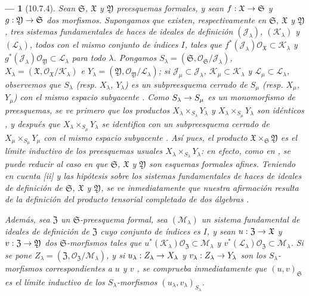 \documentclass[oneside]{amsart}
\theoremstyle{ega-env-style}
\newtheorem*{env}{---}
\theoremstyle{ega-thm-env-style}
\theoremstyle{ega-defn-env-style}
\renewcommand{\to}{\mathchoice{\longrightarrow}{\rightarrow}{\rightarrow}{\rightarrow}}
\newcommand{\oldpage}[2][]{{\marginnote{\normalfont{\textbf{#1}~|~#2}}}\ignorespaces}
\let\EGAOriginalLabel\label
\renewcommand{\label}[1]{\phantomsection\EGAOriginalLabel{#1}}
\begin{document}
\begin{env}[10.7.4]
\label{I.10.7.4}
Sean $\mathfrak{S}$, $\mathfrak{X}$ y $\mathfrak{Y}$ preesquemas formales, y sean $f:\mathfrak{X}\to\mathfrak{S}$ y $g:\mathfrak{Y}\to\mathfrak{S}$ dos morfismos.
Supongamos que existen, respectivamente en $\mathfrak{S}$, $\mathfrak{X}$ y $\mathfrak{Y}$, tres sistemas fundamentales de haces de ideales de definición $(\mathscr{J}_\lambda)$, $(\mathscr{K}_\lambda)$ y $(\mathscr{L}_\lambda)$, todos con el mismo conjunto de índices $I$, tales que $f^*(\mathscr{J}_\lambda)\mathscr{O}_{\mathfrak{X}}
\subset\mathscr{K}_\lambda$ y $g^*(\mathscr{J}_\lambda)\mathscr{O}_{\mathfrak{Y}}
\subset\mathscr{L}_\lambda$ para todo $\lambda$.
Pongamos $S_\lambda=(\mathfrak{S},
\mathscr{O}_{\mathfrak{S}}/\mathscr{J}_\lambda)$, $X_\lambda=(\mathfrak{X},
\mathscr{O}_{\mathfrak{X}}/\mathscr{K}_\lambda)$ e $Y_\lambda=(\mathfrak{Y},
\mathscr{O}_{\mathfrak{Y}}/\mathscr{L}_\lambda)$; si $\mathscr{J}_\mu\subset\mathscr{J}_\lambda$, $\mathscr{K}_\mu\subset\mathscr{K}_\lambda$ y $\mathscr{L}_\mu\subset\mathscr{L}_\lambda$, observemos que $S_\lambda$ (resp. $X_\lambda$, $Y_\lambda$) es un subpreesquema cerrado de $S_\mu$ (resp. $X_\mu$, $Y_\mu$) con el \emph{mismo}
\oldpage[I]{194}
espacio subyacente .
Como $S_\lambda\to S_\mu$ es un monomorfismo de preesquemas, se ve primero que los productos $X_\lambda\times_{S_\lambda}Y_\lambda$ y $X_\lambda\times_{S_\mu}Y_\lambda$ son idénticos , y después que $X_\lambda\times_{S_\mu}Y_\lambda$ se identifica con un subpreesquema cerrado de $X_\mu\times_{S_\mu}Y_\mu$ con el \emph{mismo} espacio subyacente .
Así pues, el producto $\mathfrak{X}\times_{\mathfrak{S}}\mathfrak{Y}$ es el \emph{límite inductivo} de los preesquemas usuales $X_\lambda\times_{S_\lambda}Y_\lambda$: en efecto, como en , se puede reducir al caso en que $\mathfrak{S}$, $\mathfrak{X}$ y $\mathfrak{Y}$ son esquemas formales afines.
Teniendo en cuenta [ii] y las hipótesis sobre los sistemas fundamentales de haces de ideales de definición de $\mathfrak{S}$, $\mathfrak{X}$ y $\mathfrak{Y}$, se ve inmediatamente que nuestra afirmación resulta de la definición del producto tensorial completado de dos álgebras .

Además, sea $\mathfrak{Z}$ un $\mathfrak{S}$-preesquema formal, sea $(\mathscr{M}_\lambda)$ un sistema fundamental de ideales de definición de $\mathfrak{Z}$ cuyo conjunto de índices es $I$, y sean $u:\mathfrak{Z}\to\mathfrak{X}$ y $v:\mathfrak{Z}\to\mathfrak{Y}$ dos $\mathfrak{S}$-morfismos tales que $u^*(\mathscr{K}_\lambda)\mathscr{O}_{\mathfrak{Z}}
\subset\mathscr{M}_\lambda$ y $v^*(\mathscr{L}_\lambda)\mathscr{O}_{\mathfrak{Z}}
\subset\mathscr{M}_\lambda$.
Si se pone $Z_\lambda=(\mathfrak{Z},
\mathscr{O}_{\mathfrak{Z}}/\mathscr{M}_\lambda)$, y si $u_\lambda:Z_\lambda\to X_\lambda$ y $v_\lambda:Z_\lambda\to Y_\lambda$ son los $S_\lambda$-morfismos correspondientes a $u$ y $v$ , se comprueba inmediatamente que $(u,v)_{\mathfrak{S}}$ es el límite inductivo de los $S_\lambda$-morfismos $(u_\lambda,v_\lambda)_{S_\lambda}$.


\end{env}
\end{document}
